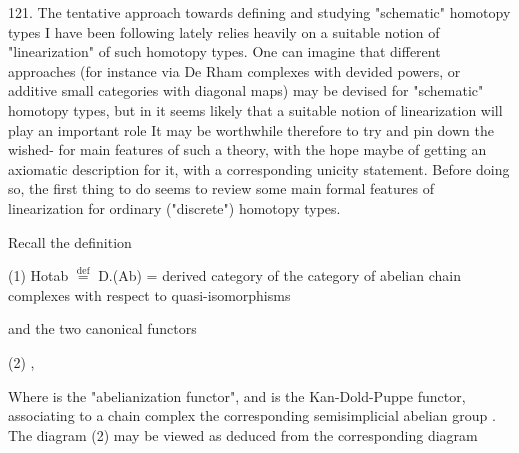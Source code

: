 
121.    The tentative approach towards defining and studying "schematic"
homotopy types I have been following lately relies heavily on a suitable
notion of "linearization" of such homotopy types.  One  can imagine
that  different approaches (for instance via De Rham complexes
with devided powers,  or additive small categories with diagonal maps)
\margin{$\times$}may be devised for "schematic" homotopy types,  but in  it seems
likely that a suitable notion of linearization will play an important
role  It may be worthwhile therefore to try and pin down the wished-%
for main features of such a theory,  with the hope maybe of getting an
axiomatic description for it,  with a corresponding unicity statement.
Before doing so,  the first thing to do seems to review some main formal
features of linearization for ordinary ("discrete") homotopy types.

Recall the definition

(1) \qquad Hotab $\overset{\mathrm{def}}{=}$ D.(Ab) = derived category of the category of
 abelian chain complexes\hand{,} with
respect to quasi-isomorphisms\hand{,}

and the two canonical functors

(2) \qquad {} \quad ,

Where  is the "abelianization functor",  and  is the Kan-Dold-Puppe
functor,  associating to a chain complex the  corresponding
semisimplicial abelian group .  The diagram (2) may be viewed as deduced
from the corresponding diagram

